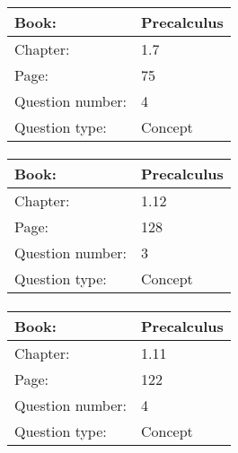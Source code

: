 \documentclass{article}
\begin{document}
        
            \paragraph{}
            \begin{tabularx}{1\textwidth}{
                    p{}
                    p{}
                }
                \toprule
                Book: & Precalculus
                \\
                \midrule
                Chapter: & 1.7
                \\
                \midrule
                Page: & 75
                \\
                \midrule
                Question number: & 4
                \\
                \midrule
                Question type: & Concept
                \\
                \bottomrule
            \end{tabularx}
            
            \paragraph{}
            \begin{tabularx}{1\textwidth}{
                    p{}
                    p{}
                }
                \toprule
                Book: & Precalculus
                \\
                \midrule
                Chapter: & 1.12
                \\
                \midrule
                Page: & 128
                \\
                \midrule
                Question number: & 3
                \\
                \midrule
                Question type: & Concept
                \\
                \bottomrule
            \end{tabularx}
            
            \paragraph{}
            \begin{tabularx}{1\textwidth}{
                    p{}
                    p{}
                }
                \toprule
                Book: & Precalculus
                \\
                \midrule
                Chapter: & 1.11
                \\
                \midrule
                Page: & 122
                \\
                \midrule
                Question number: & 4
                \\
                \midrule
                Question type: & Concept
                \\
                \bottomrule
            \end{tabularx}
            
\end{document}
